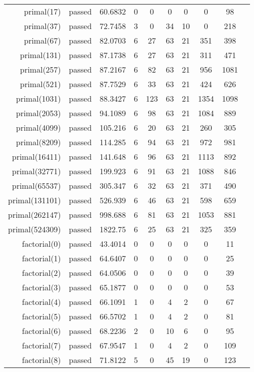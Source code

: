 \begin{longtable}{r|ccccccccc}
    primal(17) & passed & 60.6832 & 0 & 0 & 0 & 0 & 0 & 98 \\
    primal(37) & passed & 72.7458 & 3 & 0 & 34 & 10 & 0 & 218 \\
    primal(67) & passed & 82.0703 & 6 & 27 & 63 & 21 & 351 & 398 \\
    primal(131) & passed & 87.1738 & 6 & 27 & 63 & 21 & 311 & 471 \\
    primal(257) & passed & 87.2167 & 6 & 82 & 63 & 21 & 956 & 1081 \\
    primal(521) & passed & 87.7529 & 6 & 33 & 63 & 21 & 424 & 626 \\
    primal(1031) & passed & 88.3427 & 6 & 123 & 63 & 21 & 1354 & 1098 \\
    primal(2053) & passed & 94.1089 & 6 & 98 & 63 & 21 & 1084 & 889 \\
    primal(4099) & passed & 105.216 & 6 & 20 & 63 & 21 & 260 & 305 \\
    primal(8209) & passed & 114.285 & 6 & 94 & 63 & 21 & 972 & 981 \\
    primal(16411) & passed & 141.648 & 6 & 96 & 63 & 21 & 1113 & 892 \\
    primal(32771) & passed & 199.923 & 6 & 91 & 63 & 21 & 1088 & 846 \\
    primal(65537) & passed & 305.347 & 6 & 32 & 63 & 21 & 371 & 490 \\
    primal(131101) & passed & 526.939 & 6 & 46 & 63 & 21 & 598 & 659 \\
    primal(262147) & passed & 998.688 & 6 & 81 & 63 & 21 & 1053 & 881 \\
    primal(524309) & passed & 1822.75 & 6 & 25 & 63 & 21 & 325 & 359 \\
    factorial(0) & passed & 43.4014 & 0 & 0 & 0 & 0 & 0 & 11 \\
    factorial(1) & passed & 64.6407 & 0 & 0 & 0 & 0 & 0 & 25 \\
    factorial(2) & passed & 64.0506 & 0 & 0 & 0 & 0 & 0 & 39 \\
    factorial(3) & passed & 65.1877 & 0 & 0 & 0 & 0 & 0 & 53 \\
    factorial(4) & passed & 66.1091 & 1 & 0 & 4 & 2 & 0 & 67 \\
    factorial(5) & passed & 66.5702 & 1 & 0 & 4 & 2 & 0 & 81 \\
    factorial(6) & passed & 68.2236 & 2 & 0 & 10 & 6 & 0 & 95 \\
    factorial(7) & passed & 67.9547 & 1 & 0 & 4 & 2 & 0 & 109 \\
    factorial(8) & passed & 71.8122 & 5 & 0 & 45 & 19 & 0 & 123 \\

\end{longtable}
